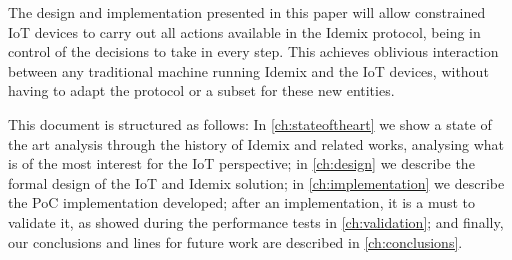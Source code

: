 The design and implementation presented in this paper will allow constrained IoT devices to carry out all actions available in the Idemix protocol, being in control of the decisions to take in every step. This achieves oblivious interaction between any traditional machine running Idemix and the IoT devices, without having to adapt the protocol or a subset for these new entities.


\hfil


This document is structured as follows: In \autoref{ch:stateoftheart} we show a state of the art analysis through the history of Idemix and related works, analysing what is of the most interest for the IoT perspective; in \autoref{ch:design} we describe the formal design of the IoT and Idemix solution; in \autoref{ch:implementation} we describe the PoC implementation developed; after an implementation, it is a must to validate it, as showed during the performance tests in \autoref{ch:validation}; and finally, our conclusions and lines for future work are described in \autoref{ch:conclusions}.